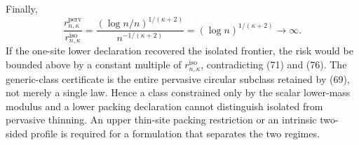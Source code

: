 Finally,
\[
 \frac{r_{n,\kappa}^{\mathrm{perv}}}{r_{n,\kappa}^{\mathrm{iso}}}
 =\frac{(\log n/n)^{1/(\kappa+2)}}{n^{-1/(\kappa+2)}}
 =(\log n)^{1/(\kappa+2)}\longrightarrow\infty. \tag{76}
\]
If the one-site lower declaration recovered the isolated frontier, the risk would be bounded above by a constant multiple of \(r_{n,\kappa}^{\mathrm{iso}}\), contradicting (71) and (76). The generic-class certificate is the entire pervasive circular subclass retained by (69), not merely a single law. Hence a class constrained only by the scalar lower-mass modulus and a lower packing declaration cannot distinguish isolated from pervasive thinning. An upper thin-site packing restriction or an intrinsic two-sided profile is required for a formulation that separates the two regimes.